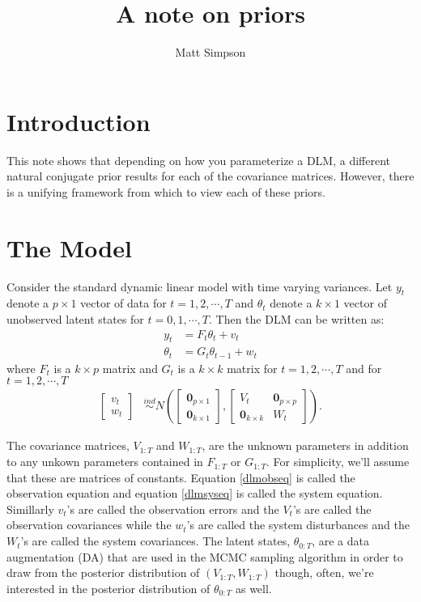 \documentclass{article}\usepackage[]{graphicx}\usepackage[]{color}
\begin{document}
\title{A note on priors}
\author{Matt Simpson}
\maketitle


\section{Introduction}
This note shows that depending on how you parameterize a DLM, a different natural conjugate prior results for each of the covariance matrices. However, there is a unifying framework from which to view each of these priors.

\section{The Model}
Consider the standard dynamic linear model with time varying variances. Let $y_t$ denote a $p\times 1$ vector of data for $t=1,2,\cdots,T$ and $\theta_t$ denote a $k\times 1$ vector of unobserved latent states for $t=0,1,\cdots,T$. Then the DLM can be written as:
\begin{align}
  y_t & = F_t\theta_t + v_t \label{dlmobseq}\\
  \theta_t & = G_t\theta_{t-1} + w_t \label{dlmsyseq}
\end{align}
where $F_t$ is a $k\times p$ matrix and $G_t$ is a $k \times k$ matrix for $t=1,2,\cdots,T$ and for $t=1,2,\cdots,T$
\begin{align*}
  \begin{bmatrix} v_t \\ w_t \end{bmatrix} &\stackrel{ind}{\sim} N\left(\begin{bmatrix} \bm{0}_{p\times 1} \\ \bm{0}_{k\times 1} \end{bmatrix}, \begin{bmatrix} V_t & \bm{0}_{p\times p} \\ \bm{0}_{k\times k} & W_t \end{bmatrix} \right).
\end{align*}

The covariance matrices, $V_{1:T}$ and $W_{1:T}$, are the unknown parameters in addition to any unkown parameters contained in $F_{1:T}$ or $G_{1:T}$. For simplicity, we'll assume that these are matrices of constants. Equation \eqref{dlmobseq} is called the observation equation and equation \eqref{dlmsyseq} is called the system equation. Simillarly $v_t$'s are called the observation errors and the $V_t$'s are called the observation covariances while the $w_t$'s are called the system disturbances and the $W_t$'s are called the system covariances. The latent states, $\theta_{0:T}$, are a data augmentation (DA) that are used in the MCMC sampling algorithm in order to draw from the posterior distribution of $(V_{1:T},W_{1:T})$ though, often, we're interested in the posterior distribution of $\theta_{0:T}$ as well.
\end{document}
